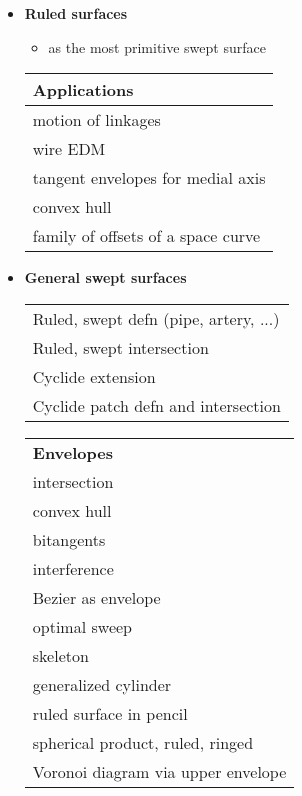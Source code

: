 \clearpage

\begin{itemize}
\item
{\bf Ruled surfaces}
\begin{itemize}
\item as the most primitive swept surface
\end{itemize}

\begin{table}[h]
\centering
\begin{tabular}{|l|}
%
\hline
{\bf Applications} \\
\hline
motion of linkages \\
wire EDM \\
tangent envelopes for medial axis \\
convex hull \\
family of offsets of a space curve \\
\hline
\end{tabular}
\end{table}

\clearpage

\item
{\bf General swept surfaces}

\begin{table}[h]
\centering
\begin{tabular}{|l|}
%
\hline
Ruled, swept defn (pipe, artery, ...) \\
Ruled, swept intersection \\
Cyclide extension \\
Cyclide patch defn and intersection \\
\hline
\end{tabular}
\end{table}

\begin{table}[h]
\centering
\begin{tabular}{|l|}
\hline
{\bf Envelopes} \\
intersection\\
convex hull \\
bitangents \\
interference \\
Bezier as envelope \\
optimal sweep \\
skeleton \\
generalized cylinder \\
ruled surface in pencil \\
spherical product, ruled, ringed \\
Voronoi diagram via upper envelope \\
\hline
\end{tabular}
\end{table}


\end{itemize}
